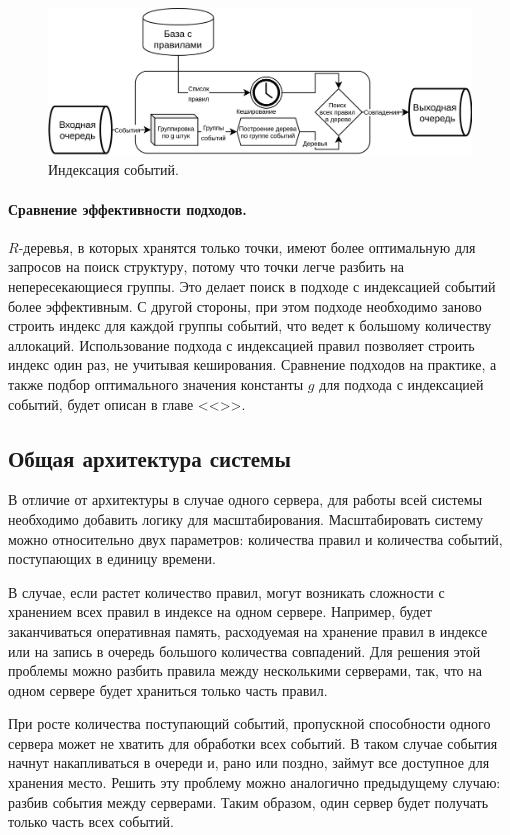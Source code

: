 \documentclass[14pt]{article}
\begin{document}
\begin{figure}[h]
  \centering
    \includegraphics[width=1\textwidth]{images/arch/pointsArch.png}
  \caption{Индексация событий.}
\end{figure}

\paragraph{Сравнение эффективности подходов.} $R$-деревья, в которых хранятся только точки, имеют более оптимальную для запросов на поиск структуру, потому что точки легче разбить на непересекающиеся группы. Это делает поиск в подходе с индексацией событий более эффективным. С другой стороны, при этом подходе необходимо заново строить индекс для каждой группы событий, что ведет к большому количеству аллокаций. Использование подхода с индексацией правил позволяет строить индекс один раз, не учитывая кеширования. Сравнение подходов на практике, а также подбор оптимального значения константы $g$ для подхода с индексацией событий, будет описан в главе <<>>.

\subsection{Общая архитектура системы}
\label{section:commonArch}
В отличие от архитектуры в случае одного сервера, для работы всей системы необходимо добавить логику для масштабирования. Масштабировать систему можно относительно двух параметров: количества правил и количества событий, поступающих в единицу времени. 

В случае, если растет количество правил, могут возникать сложности с хранением всех правил в индексе на одном сервере. Например, будет заканчиваться оперативная память, расходуемая на хранение правил в индексе или на запись в очередь большого количества совпадений. Для решения этой проблемы можно разбить правила между несколькими серверами, так, что на одном сервере будет храниться только часть правил.

При росте количества поступающий событий, пропускной способности одного сервера может не хватить для обработки всех событий. В таком случае события начнут накапливаться в очереди и, рано или поздно, займут все доступное для хранения место. Решить эту проблему можно аналогично предыдущему случаю: разбив события между серверами. Таким образом, один сервер будет получать только часть всех событий.
\end{document}
